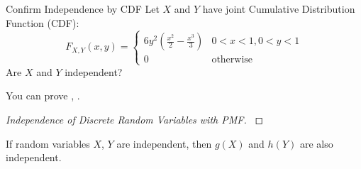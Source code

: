 \begin{example}{Confirm Independence by CDF}
  Let $X$ and $Y$ have joint Cumulative Distribution Function (CDF):
  \begin{equation*}
    F_{X,Y} \left( x,y \right) = \begin{cases}
      6y^{2} \left( \frac{x^{2}}{2} - \frac{x^{3}}{3} \right) & 0 < x < 1, 0 < y < 1 \\
      0 & \text{otherwise}
    \end{cases}
  \end{equation*}
  Are $X$ and $Y$ independent?
\end{example}
You can prove , .
\begin{proof}[Independence of Discrete Random Variables with PMF]\label{proof:Independence of Discrete Random Variables with PMF}

\end{proof}
\begin{theorem}\label{thm:Independence of Random Functions}
  If random variables $X$, $Y$ are independent, then $g\left( X \right)$ and $h \left( Y \right)$ are also independent.
\end{theorem}

